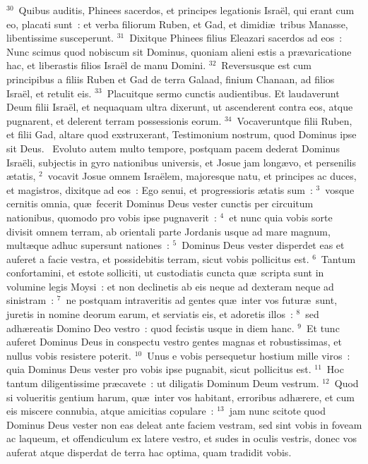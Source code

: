 ${}^{30}$~Quibus auditis, Phinees sacerdos, et principes legationis Isra\"el, qui erant cum eo, placati sunt~: et verba filiorum Ruben, et Gad, et dimidi\ae\ tribus Manasse, libentissime susceperunt.
${}^{31}$~Dixitque Phinees filius Eleazari sacerdos ad eos~: Nunc scimus quod nobiscum sit Dominus, quoniam alieni estis a pr\ae varicatione hac, et liberastis filios Isra\"el de manu Domini.
${}^{32}$~Reversusque est cum principibus a filiis Ruben et Gad de terra Galaad, finium Chanaan, ad filios Isra\"el, et retulit eis.
${}^{33}$~Placuitque sermo cunctis audientibus. Et laudaverunt Deum filii Isra\"el, et nequaquam ultra dixerunt, ut ascenderent contra eos, atque pugnarent, et delerent terram possessionis eorum.
${}^{34}$~Vocaveruntque filii Ruben, et filii Gad, altare quod exstruxerant, Testimonium nostrum, quod Dominus ipse sit Deus.
~\lettrine[lines=10,image=true,loversize=0.05,lraise=-0.03]{E}{}voluto autem multo tempore, postquam pacem dederat Dominus Isra\"eli, subjectis in gyro nationibus universis, et Josue jam long\ae vo, et persenilis \ae tatis,
${}^{2}$~vocavit Josue omnem Isra\"elem, majoresque natu, et principes ac duces, et magistros, dixitque ad eos~: Ego senui, et progressioris \ae tatis sum~:
${}^{3}$~vosque cernitis omnia, qu\ae\ fecerit Dominus Deus vester cunctis per circuitum nationibus, quomodo pro vobis ipse pugnaverit~:
${}^{4}$~et nunc quia vobis sorte divisit omnem terram, ab orientali parte Jordanis usque ad mare magnum, mult\ae que adhuc supersunt nationes~:
${}^{5}$~Dominus Deus vester disperdet eas et auferet a facie vestra, et possidebitis terram, sicut vobis pollicitus est.
${}^{6}$~Tantum confortamini, et estote solliciti, ut custodiatis cuncta qu\ae\ scripta sunt in volumine legis Moysi~: et non declinetis ab eis neque ad dexteram neque ad sinistram~:
${}^{7}$~ne postquam intraveritis ad gentes qu\ae\ inter vos futur\ae\ sunt, juretis in nomine deorum earum, et serviatis eis, et adoretis illos~:
${}^{8}$~sed adh\ae reatis Domino Deo vestro~: quod fecistis usque in diem hanc.
${}^{9}$~Et tunc auferet Dominus Deus in conspectu vestro gentes magnas et robustissimas, et nullus vobis resistere poterit.
${}^{10}$~Unus e vobis persequetur hostium mille viros~: quia Dominus Deus vester pro vobis ipse pugnabit, sicut pollicitus est.
${}^{11}$~Hoc tantum diligentissime pr\ae cavete~: ut diligatis Dominum Deum vestrum.
${}^{12}$~Quod si volueritis gentium harum, qu\ae\ inter vos habitant, erroribus adh\ae rere, et cum eis miscere connubia, atque amicitias copulare~:
${}^{13}$~jam nunc scitote quod Dominus Deus vester non eas deleat ante faciem vestram, sed sint vobis in foveam ac laqueum, et offendiculum ex latere vestro, et sudes in oculis vestris, donec vos auferat atque disperdat de terra hac optima, quam tradidit vobis.
